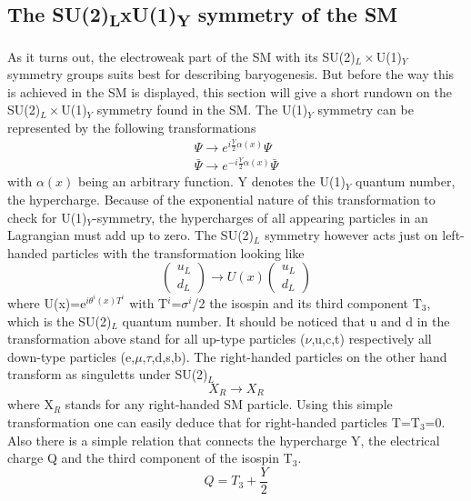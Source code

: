 \subsection{The SU(2)\textsubscript{L}xU(1)\textsubscript{Y} symmetry of the SM}
As it turns out, the electroweak part of the SM with its SU(2)$_L\times$U(1)$_Y$ symmetry groups suits best for describing baryogenesis. But before the way this is achieved in the SM is displayed, this section will give a short rundown on the SU(2)$_L\times$U(1)$_Y$ symmetry found in the SM.\newline
The U(1)$_Y$ symmetry can be represented by the following transformations
\begin{align*}
\Psi \longrightarrow e^{i\frac{Y}{2}\alpha(x)}\Psi\\
\bar{\Psi} \longrightarrow e^{-i\frac{Y}{2}\alpha(x)}\bar{\Psi}
\end{align*}
with $\alpha(x)$ being an arbitrary function. Y denotes the U(1)$_Y$ quantum number, the hypercharge. Because of the exponential nature of this transformation to check for U(1)$_Y$-symmetry, the hypercharges of all appearing particles in an Lagrangian must add up to zero. \newline
The SU(2)$_L$ symmetry however acts just on left-handed particles with the transformation looking like
\begin{equation*}
	\left(\begin{array}{c}u_L\\d_L\end{array}\right)\longrightarrow U(x)	\left(\begin{array}{c}u_L\\d_L\end{array}\right)
\end{equation*}
where U(x)=e$^{i\theta^i(x)T^i}$ with T$^i$=$\sigma^i$/2 the isospin and its third component T$_3$, which is the SU(2)$_L$ quantum number. It should be noticed that u and d in the transformation above stand for all up-type particles ($\nu$,u,c,t) respectively all down-type particles (e,$\mu$,$\tau$,d,s,b). The right-handed particles on the other hand transform as singuletts under SU(2)$_L$
\begin{equation*}
	X_R\longrightarrow X_R
\end{equation*}
where X$_R$ stands for any right-handed SM particle. Using this simple transformation one can easily deduce that for right-handed particles T=T$_3$=0.\newline
Also there is a simple relation that connects the hypercharge Y, the electrical charge Q and the third component of the isospin T$_3$.
\begin{equation}
Q=T_3+\frac{Y}{2}
\label{eq:ladung_hyperladung_isospin}
\end{equation}
